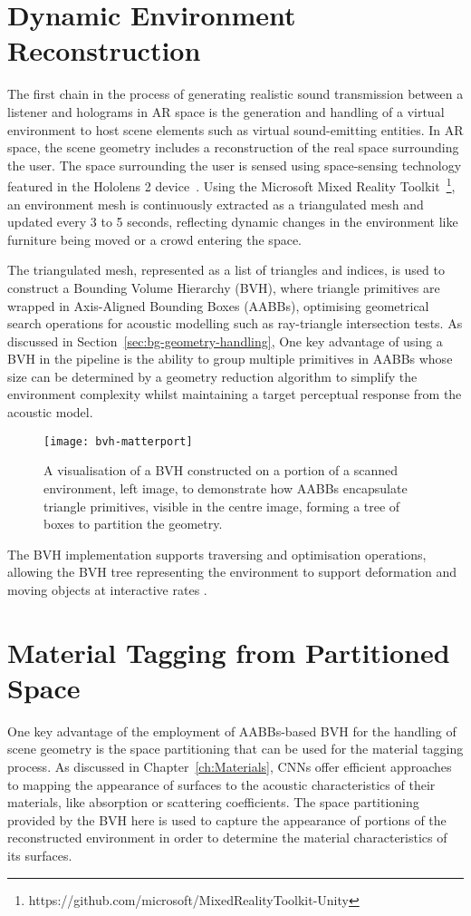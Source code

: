 \section{Dynamic Environment Reconstruction}
The first chain in the process of generating realistic sound transmission between a listener and holograms in AR space is the generation and handling of a virtual environment to host scene elements such as virtual sound-emitting entities. In AR space, the scene geometry includes a reconstruction of the real space surrounding the user. The space surrounding the user is sensed using space-sensing technology featured in the Hololens 2 device~\citep{ungureanu2020hololens}. Using the Microsoft Mixed Reality Toolkit~\footnote{https://github.com/microsoft/MixedRealityToolkit-Unity}, an environment mesh is continuously extracted as a triangulated mesh and updated every 3 to 5 seconds, reflecting dynamic changes in the environment like furniture being moved or a crowd entering the space.\par
The triangulated mesh, represented as a list of triangles and indices, is used to construct a Bounding Volume Hierarchy (BVH), where triangle primitives are wrapped in Axis-Aligned Bounding Boxes (AABBs), optimising geometrical search operations for acoustic modelling such as ray-triangle intersection tests. As discussed in Section~\ref{sec:bg-geometry-handling}, One key advantage of using a BVH in the pipeline is the ability to group multiple primitives in AABBs whose size can be determined by a geometry reduction algorithm to simplify the environment complexity whilst maintaining a target perceptual response from the acoustic model. \par
\begin{figure}[htb]
    \centering
    \texttt{[image: bvh-matterport]}
    \caption{A visualisation of a BVH constructed on a portion of a scanned environment, left image, to demonstrate how AABBs encapsulate triangle primitives, visible in the centre image, forming a tree of boxes to partition the geometry.}
\label{fig:bvh-visualisation}
\end{figure}
The BVH implementation supports traversing and optimisation operations, allowing the BVH tree representing the environment to support deformation and moving objects at interactive rates \cite{wald2007ray}.

\section{Material Tagging from Partitioned Space}
One key advantage of the employment of AABBs-based BVH for the handling of scene geometry is the space partitioning that can be used for the material tagging process. As discussed in Chapter~\ref{ch:Materials}, CNNs offer efficient approaches to mapping the appearance of surfaces to the acoustic characteristics of their materials, like absorption or scattering coefficients. The space partitioning provided by the BVH here is used to capture the appearance of portions of the reconstructed environment in order to determine the material characteristics of its surfaces.\par

